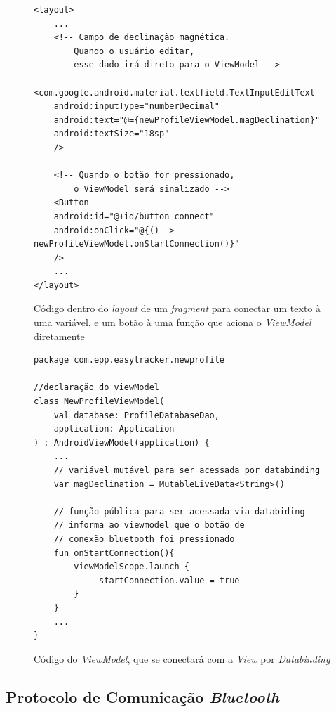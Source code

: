 \begin{figure}[!htb]
	\centering
	\caption{Código dentro do \textit{layout} de um \textit{fragment} para conectar um texto à uma variável, e um botão à uma função que aciona o \textit{ViewModel} diretamente}
	\vspace{-15pt}
	\begin{verbatim}
<layout>
	...
	<!-- Campo de declinação magnética. 
		Quando o usuário editar, 
		esse dado irá direto para o ViewModel -->
	<com.google.android.material.textfield.TextInputEditText
	android:inputType="numberDecimal"
	android:text="@={newProfileViewModel.magDeclination}"
	android:textSize="18sp"
	/>
	
	<!-- Quando o botão for pressionado, 
		o ViewModel será sinalizado -->
	<Button
	android:id="@+id/button_connect"
	android:onClick="@{() -> newProfileViewModel.onStartConnection()}"
	/>
	...
</layout>
	\end{verbatim}
	\label{code:viewmodelbutton}
	\vspace{-30pt}
\end{figure}


\begin{figure}[!htb]
	\centering
	\caption{Código do \textit{ViewModel}, que se conectará com a \textit{View} por \textit{Databinding}}
	\vspace{-15pt}
	\begin{verbatim}
package com.epp.easytracker.newprofile

//declaração do viewModel
class NewProfileViewModel(
	val database: ProfileDatabaseDao,
	application: Application
) : AndroidViewModel(application) {		
	...
	// variável mutável para ser acessada por databinding
	var magDeclination = MutableLiveData<String>()
	
	// função pública para ser acessada via databiding
	// informa ao viewmodel que o botão de
	// conexão bluetooth foi pressionado
	fun onStartConnection(){
		viewModelScope.launch {
			_startConnection.value = true
		}
	}
	...
}
	\end{verbatim}
	\label{code:viewmodel}
	\vspace{-30pt}
\end{figure}

\subsection{Protocolo de Comunicação \textit{Bluetooth}}

